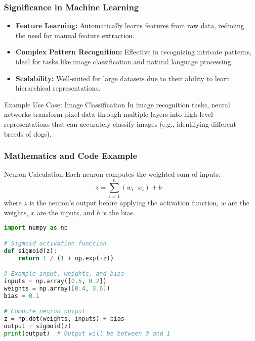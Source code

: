 \documentclass[aspectratio=169]{beamer}
\begin{document}
\begin{frame}[fragile]
    \frametitle{Significance in Machine Learning}
    \begin{itemize}
        \item \textbf{Feature Learning:} Automatically learns features from raw data, reducing the need for manual feature extraction.
        \item \textbf{Complex Pattern Recognition:} Effective in recognizing intricate patterns, ideal for tasks like image classification and natural language processing.
        \item \textbf{Scalability:} Well-suited for large datasets due to their ability to learn hierarchical representations.
    \end{itemize}
    \begin{block}{Example Use Case: Image Classification}
        In image recognition tasks, neural networks transform pixel data through multiple layers into high-level representations that can accurately classify images (e.g., identifying different breeds of dogs).
    \end{block}
\end{frame}

\begin{frame}[fragile]
    \frametitle{Mathematics and Code Example}
    \begin{block}{Neuron Calculation}
        Each neuron computes the weighted sum of inputs:
        \begin{equation}
            z = \sum_{i=1}^{n} (w_i \cdot x_i) + b
        \end{equation}
        where \( z \) is the neuron's output before applying the activation function, \( w \) are the weights, \( x \) are the inputs, and \( b \) is the bias.
    \end{block}
    \begin{lstlisting}[language=Python]
import numpy as np

# Sigmoid activation function
def sigmoid(z):
    return 1 / (1 + np.exp(-z))

# Example input, weights, and bias
inputs = np.array([0.5, 0.2])
weights = np.array([0.4, 0.6])
bias = 0.1

# Compute neuron output
z = np.dot(weights, inputs) + bias
output = sigmoid(z)
print(output)  # Output will be between 0 and 1
    \end{lstlisting}
\end{frame}
\end{document}
